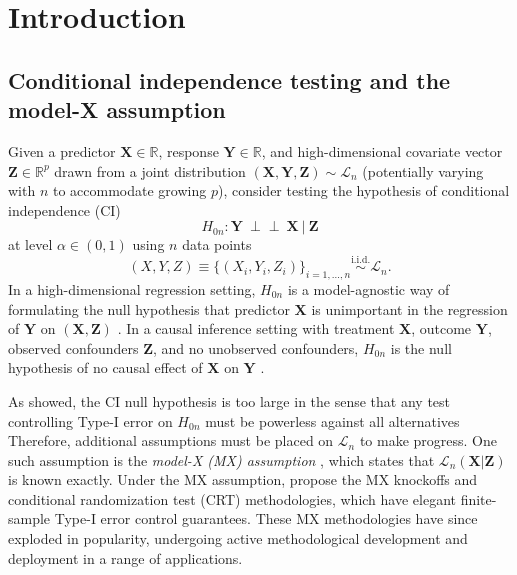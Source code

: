 \documentclass[aos]{imsart}
\theoremstyle{plain}
\theoremstyle{remark}
\newcommand{\R}{\mathbb{R}}								%
\newcommand{\independent}{{\perp \! \! \! \perp}}		%
\newcommand{\iidsim}{\stackrel{\mathrm{i.i.d.}}{\sim}} 	%
\newcommand{\prx}{\bm X}								%
\newcommand{\srx}{X}									%
\newcommand{\prz}{\bm Z}								%
\newcommand{\srz}{Z}									%
\newcommand{\pry}{{\bm Y}}								%
\newcommand{\sry}{Y}									%
\newcommand{\law}{\mathcal L}							%
\newcommand{\new}[1]{{\color{darkgreen}{#1}}}
\begin{document}
\section{Introduction}
	
\subsection{Conditional independence testing and the model-X assumption} \label{sec:ci-testing-and-mx}

Given a predictor $\prx \in \R$, response $\pry \in \R$, and high-dimensional covariate vector $\prz \in \R^{p}$ drawn from a joint distribution $(\prx, \pry, \prz) \sim \law_n$ (potentially varying with $n$ to accommodate growing $p$), consider testing the hypothesis of conditional independence (CI)
\begin{equation}
    H_{0n}: \pry\ \independent\ \prx\ |\ \prz
    \label{conditional-independence}
\end{equation}
at level $\alpha \in (0,1)$ using $n$ data points
\begin{equation}
    \label{eq:xyz}
    (\srx, \sry, \srz) \equiv \{(\srx_i, \sry_i, \srz_i)\}_{i = 1, \dots, n} \iidsim \law_n. 
\end{equation}
\new{Boldface (regular) font indicates population (sample) quantities.} In a high-dimensional regression setting, $H_{0n}$ is a model-agnostic way of formulating the null hypothesis that predictor $\prx$ is unimportant in the regression of $\pry$ on $(\prx, \prz)$ \citep{CetL16}. In a causal inference setting with treatment $\prx$, outcome $\pry$, observed confounders $\prz$, and no unobserved confounders, $H_{0n}$ is the null hypothesis of no causal effect of $\prx$ on $\pry$ \citep{Pearl2009}.

As \citet{Shah2018} showed, the CI null hypothesis is too large in the sense that any test controlling Type-I error on $H_{0n}$ must be powerless against all alternatives \new{(if we assume, for example, that $\prz$ is continuously distributed).} Therefore, additional assumptions must be placed on $\law_n$ to make progress. One such assumption is the \textit{model-X (MX) assumption} \citep{CetL16}, which states that $\law_n(\prx | \prz)$ is known exactly. Under the MX assumption, \citet{CetL16} propose the MX knockoffs and conditional randomization test (CRT) methodologies, which have elegant finite-sample Type-I error control guarantees. These MX methodologies have since exploded in popularity, undergoing active methodological development and deployment in a range of applications.
\end{document}
